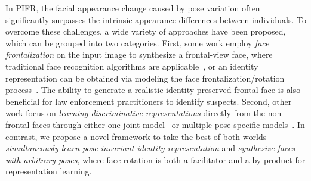 \documentclass[10pt,journal,compsoc]{IEEEtran}
\begin{document}
In PIFR, the facial appearance change caused by pose variation often significantly surpasses the intrinsic appearance differences between individuals. 
%
To overcome these challenges, a wide variety of approaches have been proposed, which can be grouped into two categories.
First, some work employ {\it face frontalization} on the input image to synthesize a frontal-view face, where traditional face recognition algorithms are applicable~\cite{hassner2015effective, zhu2015high}, or an identity representation can be obtained via modeling the face frontalization/rotation process~\cite{kan2014stacked,zhu2014multi,yim2015rotating}.
The ability to generate a realistic identity-preserved frontal face is also beneficial for law enforcement practitioners to identify suspects.
Second, other work focus on {\it learning discriminative representations} directly from the non-frontal faces through either one joint model~\cite{parkhi2015deep,schroff2015facenet} or multiple pose-specific models~\cite{masi2016pose,ding2015robust}.
In contrast, we propose a novel framework to take the best of both worlds --- {\it simultaneously learn pose-invariant identity representation} and {\it synthesize faces with arbitrary poses}, where face rotation is both a facilitator and a by-product for representation learning.
\end{document}
